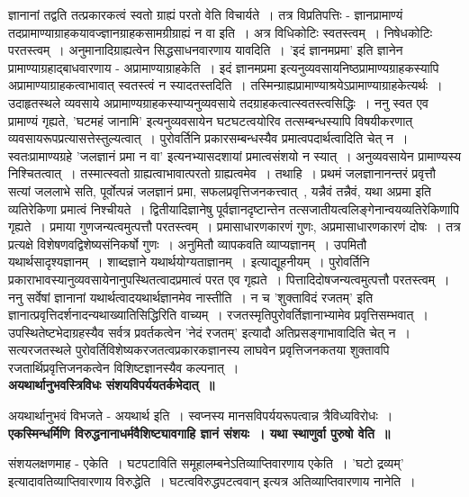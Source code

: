 		ज्ञानानां तद्वति तत्प्रकारकत्वं स्वतो ग्राह्यं परतो वेति विचार्यते~। तत्र विप्रतिपत्तिः - ज्ञानप्रामाण्यं तदप्रामाण्याग्राहकयावज्ज्ञानग्राहकसामग्रीग्राह्यं न वा इति~। अत्र विधिकोटिः स्वतस्त्वम्~। निषेधकोटिः परतस्त्वम्~। अनुमानादिग्राह्यत्वेन सिद्धसाधनवारणाय यावदिति~। ’इदं ज्ञानमप्रमा’ इति ज्ञानेन प्रामाण्याग्रहाद्बाधवारणाय - अप्रामाण्याग्राहकेति~। इदं ज्ञानमप्रमा इत्यनुव्यवसायनिष्ठप्रामाण्यग्राहकस्यापि अप्रामाण्याग्राहकत्वाभावात् स्वतस्त्वं न स्यादतस्तदिति~। तस्मिन्ग्राह्यप्रामाण्याश्रयेऽप्रामाण्याग्राहकेत्यर्थः~। उदाहृतस्थले व्यवसाये अप्रामाण्यग्राहकस्याप्यनुव्यवसाये तदग्राहकत्वात्स्वतस्त्वसिद्धिः~। ननु स्वत एव प्रामाण्यं गृह्यते, ’घटमहं जानामि’ इत्यनुव्यवसायेन घटघटत्वयोरिव तत्सम्बन्धस्यापि विषयीकरणात् व्यवसायरूपप्रत्यासत्तेस्तुल्यत्वात्~। पुरोवर्तिनि प्रकारसम्बन्धस्यैव प्रमात्वपदार्थत्वादिति चेत् न~। स्वतःप्रामाण्यग्रहे ’जलज्ञानं प्रमा न वा’ इत्यनभ्यासदशायां प्रमात्वसंशयो न स्यात्~। अनुव्यवसायेन प्रामाण्यस्य निश्चितत्वात्~। तस्मात्स्वतो ग्राह्यत्वाभावात्परतो ग्राह्यत्वमेव~। तथाहि~। प्रथमं जलज्ञानानन्तरं प्रवृत्तौ सत्यां जललाभे सति, पूर्वोत्पन्नं जलज्ञानं प्रमा, सफलप्रवृत्तिजनकत्त्वात्~, यन्नैवं तन्नैवं, यथा अप्रमा इति व्यतिरेकिणा प्रमात्वं निश्चीयते~। द्वितीयादिज्ञानेषु पूर्वज्ञानदृष्टान्तेन तत्सजातीयत्वलिङ्गेनान्वयव्यतिरेकिणापि गृह्यते~। प्रमाया गुणजन्यत्वमुत्पत्तौ परतस्त्वम्~। प्रमासाधारणकारणं गुणः, अप्रमासाधारणकारणं दोषः~। तत्र प्रत्यक्षे विशेषणवद्विशेष्यसंनिकर्षो गुणः~। अनुमितौ व्यापकवति व्याप्यज्ञानम्~। उपमितौ यथार्थसादृश्यज्ञानम्~। शाब्दज्ञाने यथार्थयोग्यताज्ञानम्~। इत्याद्यूहनीयम्~। पुरोवर्तिनि प्रकाराभावस्यानुव्यवसायेनानुपस्थितत्वादप्रमात्वं परत एव गृह्यते~। पित्तादिदोषजन्यत्वमुत्पत्तौ परतस्त्वम्~। ननु सर्वेषां ज्ञानानां यथार्थत्वादयथार्थज्ञानमेव नास्तीति~। न च ’शुक्ताविदं रजतम्’ इति ज्ञानात्प्रवृत्तिदर्शनादन्यथाख्यातिसिद्धिरिति वाच्यम्~। रजतस्मृतिपुरोवर्तिज्ञानाभ्यामेव प्रवृत्तिसम्भवात्~। उपस्थितेष्टभेदाग्रहस्यैव सर्वत्र प्रवर्तकत्वेन ’नेदं रजतम्’ इत्यादौ अतिप्रसङ्गाभावादिति चेत् न~। सत्यरजतस्थले पुरोवर्तिविशेष्यकरजतत्वप्रकारकज्ञानस्य लाघवेन प्रवृत्तिजनकतया शुक्तावपि रजतार्थिप्रवृत्तिजनकत्वेन विशिष्टज्ञानस्यैव कल्पनात्~।\\[10pt]
	{\bfseries अयथार्थानुभवस्त्रिविधः संशयविपर्ययतर्कभेदात्~॥}\par
		अयथार्थानुभवं विभजते - अयथार्थ इति~। स्वप्नस्य मानसविपर्ययरूपत्वान्न त्रैविध्यविरोधः~।\\[10pt]
	{\bfseries एकस्मिन्धर्मिणि विरुद्धनानाधर्मवैशिष्ट्यावगाहि ज्ञानं संशयः~। यथा स्थाणुर्वा पुरुषो वेति~॥}\par
		संशयलक्षणमाह - एकेति~। घटपटाविति समूहालम्बनेऽतिव्याप्तिवारणाय एकेति~। ’घटो द्रव्यम्’ इत्यादावतिव्याप्तिवारणाय विरुद्धेति~। घटत्वविरुद्धपटत्ववान् इत्यत्र अतिव्याप्तिवारणाय नानेति~।\\[10pt]

